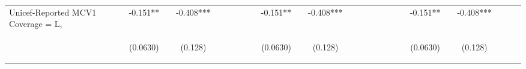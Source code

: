 \documentclass[]{article}
\begin{document}
\begin{center}
\begin{tabular}{lcccccccccccccccccccccccc}
Unicef-Reported MCV1 Coverage = L, & -0.151** &  & -0.408*** &  &  &  &  &  & -0.151** &  & -0.408*** &  &  &  &  &  &  &  & -0.151** &  & -0.408*** &  &  &  \\
\vspace{4pt} & \begin{footnotesize}(0.0630)\end{footnotesize} & \begin{footnotesize}\end{footnotesize} & \begin{footnotesize}(0.128)\end{footnotesize} & \begin{footnotesize}\end{footnotesize} & \begin{footnotesize}\end{footnotesize} & \begin{footnotesize}\end{footnotesize} & \begin{footnotesize}\end{footnotesize} & \begin{footnotesize}\end{footnotesize} & \begin{footnotesize}(0.0630)\end{footnotesize} & \begin{footnotesize}\end{footnotesize} & \begin{footnotesize}(0.128)\end{footnotesize} & \begin{footnotesize}\end{footnotesize} & \begin{footnotesize}\end{footnotesize} & \begin{footnotesize}\end{footnotesize} & \begin{footnotesize}\end{footnotesize} & \begin{footnotesize}\end{footnotesize} & \begin{footnotesize}\end{footnotesize} & \begin{footnotesize}\end{footnotesize} & \begin{footnotesize}(0.0630)\end{footnotesize} & \begin{footnotesize}\end{footnotesize} & \begin{footnotesize}(0.128)\end{footnotesize} & \begin{footnotesize}\end{footnotesize} & \begin{footnotesize}\end{footnotesize} & \begin{footnotesize}\end{footnotesize} \\

\end{tabular}
\end{center}
\end{document}
